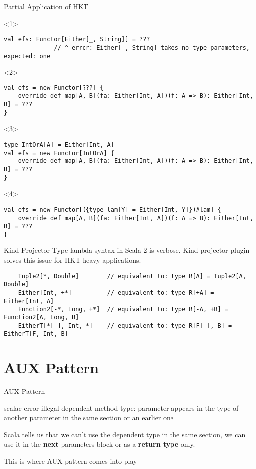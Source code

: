 \documentclass[aspectratio=169]{beamer}
\begin{document}
\begin{frame}[fragile]{Partial Application of HKT}
\begin{onlyenv}<1>
\begin{verbatim}
val efs: Functor[Either[_, String]] = ??? 
              // ^ error: Either[_, String] takes no type parameters, expected: one
\end{verbatim}
\end{onlyenv}
\begin{onlyenv}<2>
\begin{verbatim}
val efs = new Functor[???] {
    override def map[A, B](fa: Either[Int, A])(f: A => B): Either[Int, B] = ???
}
\end{verbatim}
\end{onlyenv}
\begin{onlyenv}<3>
\begin{verbatim}
type IntOrA[A] = Either[Int, A]
val efs = new Functor[IntOrA] {
    override def map[A, B](fa: Either[Int, A])(f: A => B): Either[Int, B] = ???
}
\end{verbatim}
\end{onlyenv}
\begin{onlyenv}<4>
\begin{verbatim}
val efs = new Functor[({type lam[Y] = Either[Int, Y]})#lam] {
    override def map[A, B](fa: Either[Int, A])(f: A => B): Either[Int, B] = ???
}
\end{verbatim}
\end{onlyenv}
\end{frame}

\begin{frame}[fragile]{Kind Projector}
  Type lambda syntax in Scala 2 is verbose. Kind projector plugin\cite{kind-proj} solves this issue
  for HKT-heavy applications.
  \bigskip
  \pause
  \begin{verbatim}
    Tuple2[*, Double]        // equivalent to: type R[A] = Tuple2[A, Double]
    Either[Int, +*]          // equivalent to: type R[+A] = Either[Int, A]
    Function2[-*, Long, +*]  // equivalent to: type R[-A, +B] = Function2[A, Long, B]
    EitherT[*[_], Int, *]    // equivalent to: type R[F[_], B] = EitherT[F, Int, B]
  \end{verbatim}
\end{frame}

\section{AUX Pattern}
\begin{frame}{AUX Pattern}
  \begin{block}{scalac error}
    illegal dependent method type: parameter appears in the type of another parameter in the same
    section or an earlier one
  \end{block}
  \bigskip
  Scala tells us that we can’t use the dependent type in the same section, we can use it in the
  \textbf{next} parameters block or as a \textbf{return type} only.

  This is where AUX pattern\cite{aux} comes into play
\end{frame}
\end{document}
